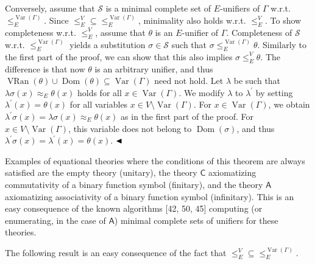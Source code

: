 \documentclass[10pt,a4paper]{amsart}
\begin{document}
Conversely, assume that $\mathcal{S}$ is a minimal complete set of $E$-unifiers of $\Gamma$ w.r.t. $\leq_{E}^{\operatorname{Var}(\Gamma)}$. Since ${\leq_{E}^{V}}\subseteq{\leq_{E}^{\operatorname{Var}(\Gamma)}}$, minimality also holds w.r.t. $\leq_{E}^{V}$. To show completeness w.r.t. $\leq_{E}^{V}$, assume that $\theta$ is an $E$-unifier of $\Gamma$. Completeness of $\mathcal{S}$ w.r.t. $\leq_{E}^{\operatorname{Var}(\Gamma)}$ yields a substitution $\sigma\in\mathcal{S}$ such that $\sigma\leq_{E}^{\operatorname{Var}(\Gamma)}\theta$. Similarly to the first part of the proof, we can show that this also implies $\sigma\leq_{E}^{V}\theta$. The difference is that now $\theta$ is an arbitrary unifier, and thus $\operatorname{VRan}(\theta)\cup\operatorname{Dom}(\theta)\subseteq%
\operatorname{Var}(\Gamma)$ need not hold. Let $\lambda$ be such that $\lambda\sigma(x)\approx_{E}\theta(x)$ holds for all $x\in\operatorname{Var}(\Gamma)$. We modify $\lambda$ to $\lambda^{\prime}$ by setting $\lambda^{\prime}(x)=\theta(x)$ for all variables $x\in V\setminus\operatorname{Var}(\Gamma)$. For $x\in\operatorname{Var}(\Gamma)$, we obtain $\lambda^{\prime}\sigma(x)=\lambda\sigma(x)\approx_{E}\theta(x)$ as in the first part of the proof. For $x\in V\setminus\operatorname{Var}(\Gamma)$, this variable does not belong to $\operatorname{Dom}(\sigma)$, and thus $\lambda^{\prime}\sigma(x)=\lambda^{\prime}(x)=\theta(x)$. $\hfill\blacktriangleleft$\par
 
 
 
Examples of equational theories where the conditions of this theorem are always satisfied are the empty theory (unitary), the theory $\mathsf{C}$ axiomatizing commutativity of a binary function symbol (finitary), and the theory $\mathsf{A}$ axiomatizing associativity of a binary function symbol (infinitary). This is an easy consequence of the known algorithms [42, 50, 45] computing (or enumerating, in the case of $\mathsf{A}$) minimal complete sets of unifiers for these theories.\par
 
 
 
The following result is an easy consequence of the fact that ${\leq_{E}^{V}}\subseteq{\leq_{E}^{\operatorname{Var}(\Gamma)}}$.\par
 
\end{document}

